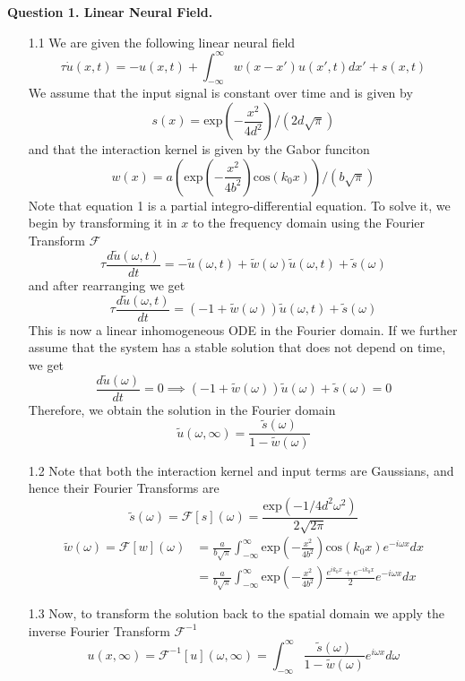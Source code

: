 \documentclass[12pt]{article}
\begin{document}
\noindent


\noindent\textbf{Question 1. Linear Neural Field.}
\begin{enumerate}
\item[1.1] We are given the following linear neural field
\begin{equation}
    \tau \dot{u}(x, t) =   -u(x, t) + \int_{-\infty}^{\infty}w(x-x')u(x', t)dx' + s(x, t)
\end{equation}
We assume that the input signal is constant over time and is given by 
\begin{equation}
    s(x) = \text{exp}\left(-\frac{x^2}{4d^2}\right)/(2d\sqrt{\pi})
\end{equation}
and that the interaction kernel is given by the Gabor funciton
\begin{equation}
    w(x) = a\left(\text{exp}\left(-\frac{x^2}{4b^2}\right)\text{cos}(k_{0}x)\right)/(b\sqrt{\pi})
\end{equation}
Note that equation 1 is a partial integro-differential equation. To solve it, we begin by transforming it in $x$ to the 
frequency domain using the Fourier Transform $\mathcal{F}$
\[
    \tau \frac{d\widetilde{u}(\omega, t)}{dt} = -\widetilde{u}(\omega, t) + \widetilde{w}(\omega)\widetilde{u}(\omega, t) + \widetilde{s}(\omega)
\]
and after rearranging we get
\[
    \tau \frac{d\widetilde{u}(\omega, t)}{dt} = (-1 + \widetilde{w}(\omega))\widetilde{u}(\omega, t) + \widetilde{s}(\omega)
\]
This is now a linear inhomogeneous ODE in the Fourier domain. If we further assume that the system has a stable solution that does not depend on time,
we get
\[
    \frac{d\widetilde{u}(\omega)}{dt} = 0 \implies (-1 + \widetilde{w}(\omega))\widetilde{u}(\omega) + \widetilde{s}(\omega) = 0
\]
Therefore, we obtain the solution in the Fourier domain
\[
    \widetilde{u}(\omega, \infty) = \frac{\widetilde{s}(\omega)}{1 - \widetilde{w}(\omega)}
\]
\item[1.2] Note that both the interaction kernel and input terms are Gaussians, and hence their Fourier Transforms are 
\[
    \widetilde{s}(\omega) = \mathcal{F}[s](\omega) =  \frac{\text{exp}(-1/4d^{2}\omega^{2})}{2\sqrt{2\pi}}
\]
\begin{align*}
    \widetilde{w}(\omega) = \mathcal{F}[w](\omega) &= \frac{a}{b\sqrt{\pi}}\int_{-\infty}^{\infty}\text{exp}\left(-\frac{x^2}{4b^{2}}\right)\text{cos}(k_{0}x)e^{-i\omega x}dx\\
                           &= \frac{a}{b\sqrt{\pi}}\int_{-\infty}^{\infty}\text{exp}\left(-\frac{x^2}{4b^{2}}\right)\frac{e^{ik_{0}x}+e^{-ik_{0}x}}{2}e^{-i\omega x}dx
\end{align*}
\item[1.3] Now, to transform the solution back to the spatial domain we apply the inverse Fourier Transform $\mathcal{F}^{-1}$
\[
    u(x, \infty) = \mathcal{F}^{-1}[u](\omega, \infty) = \int_{-\infty}^{\infty} \frac{\widetilde{s}(\omega)}{1 - \widetilde{w}(\omega)} e^{i\omega x} d\omega 
\]


\end{enumerate}
\end{document}
